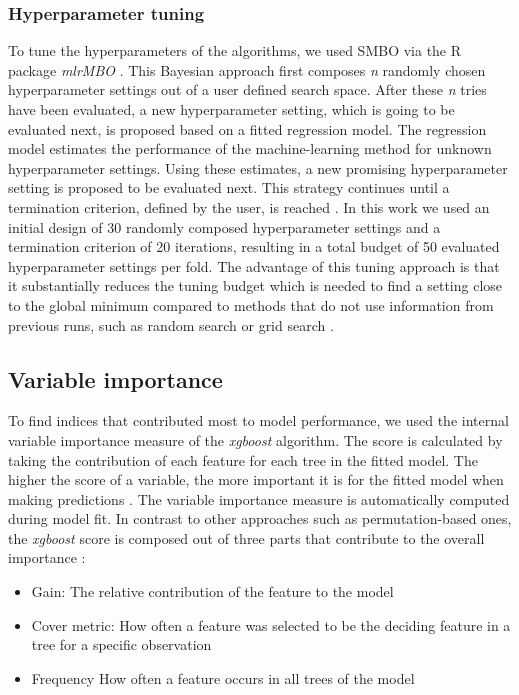 \documentclass[review]{elsarticle}
\begin{document}
\subsubsection{Hyperparameter tuning}

\noindent To tune the hyperparameters of the algorithms, we used \ac{SMBO} via the R package \textit{mlrMBO} \citep{mlrMBO}.
This Bayesian approach first composes \textit{n} randomly chosen hyperparameter settings out of a user defined search space.
After these \textit{n} tries have been evaluated, a new hyperparameter setting, which is going to be evaluated next, is proposed based on a fitted regression model.
The regression model estimates the performance of the machine-learning method for unknown hyperparameter settings.
Using these estimates, a new promising hyperparameter setting is proposed to be evaluated next.
This strategy continues until a termination criterion, defined by the user, is reached \citep{Hutter2011, Jones1998}.
In this work we used an initial design of 30 randomly composed hyperparameter settings and a termination criterion of 20 iterations, resulting in a total budget of 50 evaluated hyperparameter settings per fold.
The advantage of this tuning approach is that it substantially reduces the tuning budget which is needed to find a setting close to the global minimum compared to methods that do not use information from previous runs, such as random search or grid search \citep{Bergstra2012}.

\subsection{Variable importance}

\noindent To find indices that contributed most to model performance, we used the internal variable importance measure of the \textit{xgboost} algorithm.
The score is calculated by taking the contribution of each feature for each tree in the fitted model.
The higher the score of a variable, the more important it is for the fitted model when making predictions \citep{chenXGBoostScalableTree2016}.
The variable importance measure is automatically computed during model fit.
In contrast to other approaches such as permutation-based ones, the \textit{xgboost} score is composed out of three parts that contribute to the overall importance \citep{chenXGBoostScalableTree2016}:

\begin{itemize}
	\item Gain: The relative contribution of the feature to the model
	\item Cover metric: How often a feature was selected to be the deciding feature in a tree for a specific observation
	\item Frequency How often a feature occurs in all trees of the model
\end{itemize}
\end{document}
